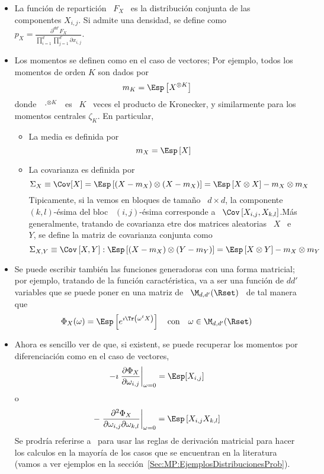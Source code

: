 \begin{itemize}
\item La funci\'on  de repartici\'on \ $F_X$ \ es  la distribuci\'on conjunta de
  las  componentes  $X_{i,j}$.   Si  admite  una  densidad,  se  define  como  \
  $\displaystyle      p_X       =      \frac{\partial^{d      d'} F_X}{\prod_{i=1}^d
    \prod_{j=1}^{d'} \partial x_{i,j}}$.
%
\item Los  momentos se definen como en  el caso de vectores;  Por ejemplo, todos
  los momentos de orden $K$ son dados por
  \[
  m_K = \Esp\left[ X^{\otimes K} \right]
  \]
  donde \  $\cdot^{\otimes K}$ \ es  \ $K$ \  veces el producto de  Kronecker, y
  similarmente para los momentos centrales $\zeta_K$. En particular,
  \begin{itemize}
  \item La media es definida por
    \[
    m_X = \Esp\left[ X \right]
    \]
  \item  La covarianza  es  definida por
    \[
    \Sigma_X  \equiv \Cov[X]  =  \Esp\left[ (X-m_X)  \otimes  (X-m_X) \right]  =
    \Esp\left[ X \otimes X \right] - m_X \otimes m_X
    \]
    Tipicamente,  si  la  vemos en  bloques  de  tama\~no  \  $d \times  d$,  la
    componente  \ $(k,l)$-\'esima  del bloc  \ $(i,j)$-\'esima  corresponde  a \
    $\Cov\left[ X_{i,j} , X_{k,l} \right]$.\newline M\'as generalmente, tratando
    de covarianza  etre dos matrices aleatorias  \ $X$ \  e \ $Y$, se  define la
    matriz de covarianza conjunta como
    \[
    \Sigma_{X,Y} \equiv  \Cov\left[ X ,  Y \right] : \Esp\left[  (X-m_X) \otimes
      (Y-m_Y) \right] = \Esp\left[ X \otimes Y \right] - m_X \otimes m_Y
    \]
  \end{itemize}
%
\item  Se puede  escribir  tambi\'en  las funciones  generadoras  con una  forma
  matricial; por  ejemplo, tratando de  la funci\'on caract\'eristica, va  a ser
  una  funci\'on de  $d d'$  variables que  se puede  poner en  una matriz  de \
  $\M_{d,d'}(\Rset)$ \ de tal manera que
  \[
  \Phi_X(\omega) =  \Esp\left[ e^{\imath  \Tr\left( \omega^t X  \right)} \right]
  \quad \mbox{con} \quad \omega \in \M_{d,d'}(\Rset)
  \]
%
\item Ahora es sencillo ver de que, si existent, se puede recuperar los momentos
  por  diferenciaci\'on   como  en  el  caso  de   vectores,
  \[
  -\imath \left. \frac{\partial \Phi_X}{\partial \omega_{i,j}} \right|_{\omega =
    0} = \Esp[X_{i,j}]
  \]
  o
  \[
  - \left. \frac{\partial^2 \Phi_X}{\partial \omega_{i,j} \partial \omega_{k,l}}
  \right|_{\omega = 0} = \Esp\left[ X_{i,j} X_{k,l} \right]
  \]
  Se  prodr\'ia  referirse a~\cite[Cap.~8]{MagNeu99}  para  usar  las reglas  de
  derivaci\'on matricial  para hacer los calculos  en la mayor\'ia  de los casos
  que   se  encuentran  en   la  literatura   (vamos  a   ver  ejemplos   en  la
  secci\'on~\ref{Sec:MP:EjemplosDistribucionesProb}).
\end{itemize}



